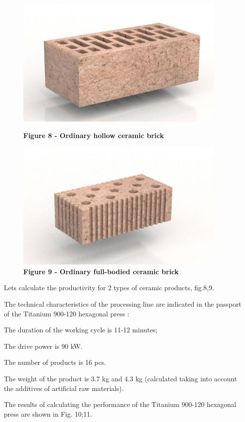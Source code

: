 \begin{figure}[H]
    \centering
    \begin{minipage}{0.49\textwidth}
		\centering
		\includegraphics[width=\textwidth]{assets/274}
		\caption*{\bfseries Figure 8 - Ordinary hollow ceramic brick}
    \end{minipage}
    \hfill
    \begin{minipage}{0.49\textwidth}
		\centering
		\includegraphics[width=\textwidth]{assets/275}
		\caption*{\bfseries Figure 9 - Ordinary full-bodied ceramic brick}
    \end{minipage}
\end{figure}

\begin{multicols}{2}


Let\textquotesingle s calculate the productivity for 2 types of ceramic
products, fig.8,9.

The technical characteristics of the processing line are indicated in
the passport of the Titanium 900-120 hexagonal press :

The duration of the working cycle is 11-12 minutes;

The drive power is 90 kW.

The number of products is 16 pcs.

The weight of the product is 3.7 kg and 4.3 kg (calculated taking into
account the additives of artificial raw materials).

The results of calculating the performance of the Titanium 900-120
hexagonal press are shown in Fig. 10;11.
\end{multicols}


